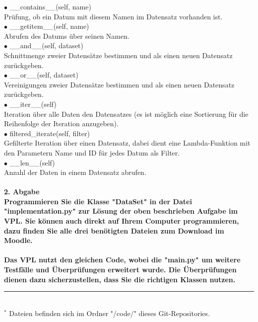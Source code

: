 \documentclass[]{article}
\begin{document}
$\bullet$ \_\_contains\_\_(self, name)\\
\hspace*{1cm} Prüfung, ob ein Datum mit diesem Namen im Datensatz vorhanden ist.\\
$\bullet$ \_\_getitem\_\_(self, name)\\
\hspace*{1cm} Abrufen des Datums über seinen Namen.\\ 
$\bullet$ \_\_and\_\_(self, dataset)\\
\hspace*{1cm} Schnittmenge zweier Datensätze bestimmen und als einen neuen Datensatz zurückgeben.\\
$\bullet$ \_\_or\_\_(self, dataset)\\
\hspace*{1cm} Vereinigungen zweier Datensätze bestimmen und als einen neuen Datensatz zurückgeben.\\
$\bullet$ \_\_iter\_\_(self)\\
\hspace*{1cm} Iteration über alle Daten den Datensatzes (es ist möglich eine Sortierung für die Reihenfolge der Iteration anzugeben).\\ 
$\bullet$ filtered\_iterate(self, filter)\\
\hspace*{1cm} Gefilterte Iteration über einen Datensatz, dabei dient eine Lambda-Funktion mit den Parametern Name und ID für jedes Datum als Filter.\\
$\bullet$ \_\_len\_\_(self)\\
\hspace*{1cm} Anzahl der Daten in einem Datensatz abrufen.\\
\\
\bf \large 2. Abgabe \normalsize \normalfont\\[0.5cm]
Programmieren Sie die Klasse "DataSet" in der Datei "implementation.py" zur Lösung der oben beschrieben Aufgabe im VPL.
Sie können auch direkt auf Ihrem Computer programmieren, dazu finden Sie alle drei benötigten Dateien zum Download im Moodle.\\
\\
Das VPL nutzt den gleichen Code, wobei die "main.py" um weitere Testfälle und Überprüfungen erweitert wurde.
Die Überprüfungen dienen dazu sicherzustellen, dass Sie die richtigen Klassen nutzen.\\
%
\hrule\hfill\\[0.2cm]
$^*$ Dateien befinden sich im Ordner "/code/" dieses Git-Repositories.\\
\end{document}
